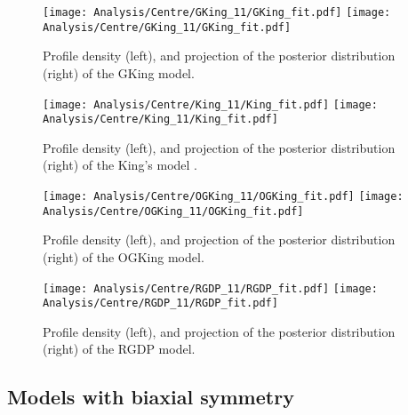 \begin {figure}
 \centering
 \texttt{[image: Analysis/Centre/GKing\_11/GKing\_fit.pdf]}
 \texttt{[image: Analysis/Centre/GKing\_11/GKing\_fit.pdf]}
  \caption{Profile density (left), and projection of the posterior distribution (right) of the GKing model.}
\label{fig:GKingctr}
\end {figure}

\begin {figure}
 \centering
 \texttt{[image: Analysis/Centre/King\_11/King\_fit.pdf]}
 \texttt{[image: Analysis/Centre/King\_11/King\_fit.pdf]}
  \caption{Profile density (left), and projection of the posterior distribution (right) of the King's model .}
\label{fig:Kingctr}
\end {figure}

\begin {figure}
 \centering
 \texttt{[image: Analysis/Centre/OGKing\_11/OGKing\_fit.pdf]}
 \texttt{[image: Analysis/Centre/OGKing\_11/OGKing\_fit.pdf]}
  \caption{Profile density (left), and projection of the posterior distribution (right) of the OGKing model.}
\label{fig:OGKingctr}
\end {figure}

\begin {figure}
 \centering
 \texttt{[image: Analysis/Centre/RGDP\_11/RGDP\_fit.pdf]}
 \texttt{[image: Analysis/Centre/RGDP\_11/RGDP\_fit.pdf]}
  \caption{Profile density (left), and projection of the posterior distribution (right) of the RGDP model.}
\label{fig:RGDPctr}
\end {figure}
\clearpage
\subsection{Models with biaxial symmetry}
\label{sect:app_biaxial}

